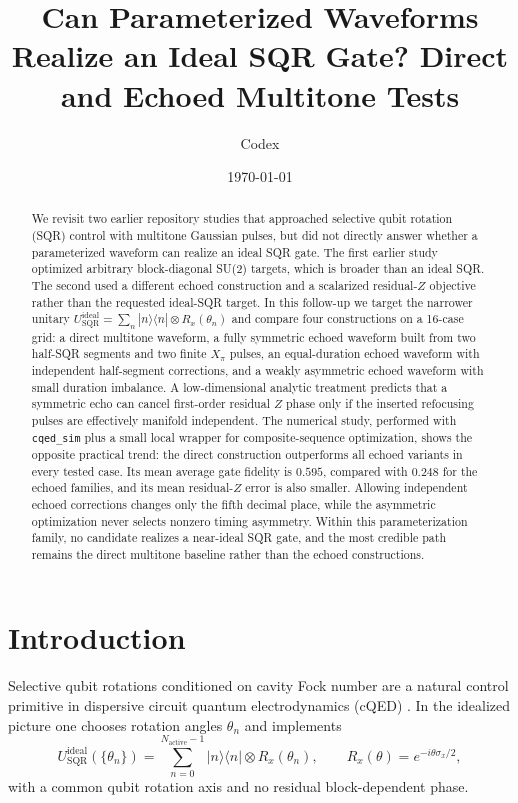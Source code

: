 \documentclass[aps,pra,twocolumn,reprint,floatfix,amsmath,amssymb]{revtex4-2}
\begin{document}
\title{Can Parameterized Waveforms Realize an Ideal SQR Gate? Direct and Echoed Multitone Tests}
\author{Codex}
\date{\today}

\begin{abstract}
We revisit two earlier repository studies that approached selective qubit rotation (SQR) control with multitone Gaussian pulses, but did not directly answer whether a parameterized waveform can realize an ideal SQR gate. The first earlier study optimized arbitrary block-diagonal SU(2) targets, which is broader than an ideal SQR. The second used a different echoed construction and a scalarized residual-$Z$ objective rather than the requested ideal-SQR target. In this follow-up we target the narrower unitary $U_{\mathrm{SQR}}^{\mathrm{ideal}}=\sum_n |n\rangle\langle n|\otimes R_x(\theta_n)$ and compare four constructions on a 16-case grid: a direct multitone waveform, a fully symmetric echoed waveform built from two half-SQR segments and two finite $X_\pi$ pulses, an equal-duration echoed waveform with independent half-segment corrections, and a weakly asymmetric echoed waveform with small duration imbalance. A low-dimensional analytic treatment predicts that a symmetric echo can cancel first-order residual $Z$ phase only if the inserted refocusing pulses are effectively manifold independent. The numerical study, performed with \texttt{cqed\_sim} plus a small local wrapper for composite-sequence optimization, shows the opposite practical trend: the direct construction outperforms all echoed variants in every tested case. Its mean average gate fidelity is $0.595$, compared with $0.248$ for the echoed families, and its mean residual-$Z$ error is also smaller. Allowing independent echoed corrections changes only the fifth decimal place, while the asymmetric optimization never selects nonzero timing asymmetry. Within this parameterization family, no candidate realizes a near-ideal SQR gate, and the most credible path remains the direct multitone baseline rather than the echoed constructions.
\end{abstract}

\maketitle

\section{Introduction}
Selective qubit rotations conditioned on cavity Fock number are a natural control primitive in dispersive circuit quantum electrodynamics (cQED) \cite{blais2021cqed,koch2007transmon}. In the idealized picture one chooses rotation angles $\theta_n$ and implements
\begin{equation}
U_{\mathrm{SQR}}^{\mathrm{ideal}}(\{\theta_n\})=
\sum_{n=0}^{N_{\mathrm{active}}-1}|n\rangle\langle n|\otimes R_x(\theta_n),
\qquad
R_x(\theta)=e^{-i\theta \sigma_x/2},
\end{equation}
with a common qubit rotation axis and no residual block-dependent phase.
\end{document}
